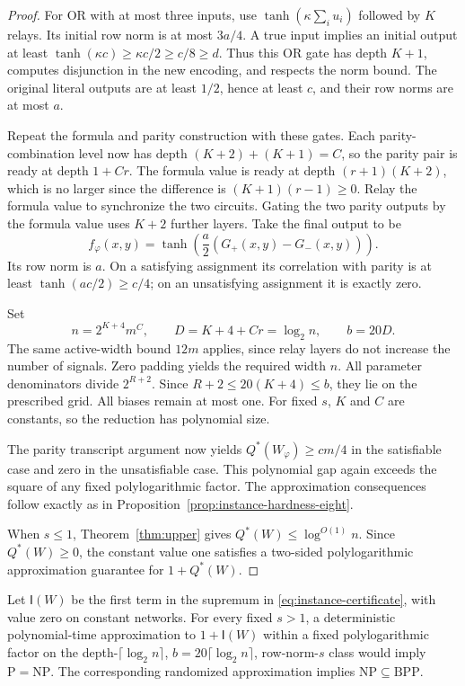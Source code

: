 \begin{proof}
For OR with at most three inputs, use
\(\tanh(\kappa\sum_i u_i)\) followed by \(K\) relays.
Its initial row norm is at most \(3a/4\).  A true input implies
an initial output at least
\(\tanh(\kappa c)\ge\kappa c/2\ge c/8\ge d\).
Thus this OR gate has depth \(K+1\), computes disjunction in
the new encoding, and respects the norm bound.
The original literal outputs are at least \(1/2\), hence at
least \(c\), and their row norms are at most \(a\).

Repeat the formula and parity construction with these gates.
Each parity-combination level now has depth
\((K+2)+(K+1)=C\), so the parity pair is ready at depth
\(1+Cr\).  The formula value is ready at depth
\((r+1)(K+2)\), which is no larger since the difference is
\((K+1)(r-1)\ge0\).  Relay the formula value to synchronize
the two circuits.  Gating the two parity outputs by the formula
value uses \(K+2\) further layers.  Take the final output to be
\[
 f_\varphi(x,y)
 =\tanh\left(\frac a2(G_+(x,y)-G_-(x,y))\right).
\]
Its row norm is \(a\).  On a satisfying assignment its
correlation with parity is at least
\(\tanh(ac/2)\ge c/4\); on an unsatisfying assignment it
is exactly zero.

Set
\[
 n=2^{K+4}m^C,\qquad
 D=K+4+Cr=\log_2n,\qquad b=20D.
\]
The same active-width bound \(12m\) applies, since relay layers
do not increase the number of signals.  Zero padding yields the
required width \(n\).  All parameter denominators divide
\(2^{R+2}\). Since \(R+2\le20(K+4)\le b\), they lie on
the prescribed grid.
All biases remain at most one.  For fixed \(s\), \(K\) and
\(C\) are constants, so the reduction has polynomial size.

The parity transcript argument now yields
\(Q^*(W_\varphi)\ge cm/4\) in the satisfiable case and zero
in the unsatisfiable case.  This polynomial gap again exceeds
the square of any fixed polylogarithmic factor.  The approximation
consequences follow exactly as in
Proposition~\ref{prop:instance-hardness-eight}.

When \(s\le1\), Theorem~\ref{thm:upper} gives
\(Q^*(W)\le\log^{O(1)}n\).  Since \(Q^*(W)\ge0\), the
constant value one satisfies a two-sided polylogarithmic
approximation guarantee for \(1+Q^*(W)\).
\end{proof}

\begin{corollary}
\label{cor:score-certificate-hardness}
Let \(\mathsf I(W)\) be the first term in the supremum in
\eqref{eq:instance-certificate}, with value zero on constant
networks.  For every fixed \(s>1\), a deterministic polynomial-time
approximation to \(1+\mathsf I(W)\) within a fixed
polylogarithmic factor on the depth-\(\lceil\log_2n\rceil\),
\(b=20\lceil\log_2n\rceil\), row-norm-\(s\) class would imply
\(\mathrm P=\mathrm{NP}\).  The corresponding randomized
approximation implies \(\mathrm{NP}\subseteq\mathrm{BPP}\).
\end{corollary}

